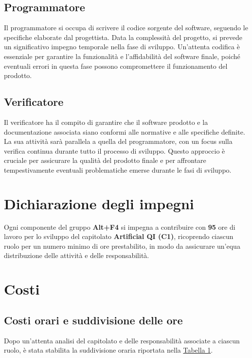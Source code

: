 \documentclass[a4paper, 12pt]{article}
\begin{document}
\subsection{Programmatore}
Il programmatore si occupa di scrivere il codice sorgente del software, seguendo le specifiche elaborate dal progettista. Data la complessità del progetto, si prevede un significativo impegno temporale nella fase di sviluppo. 
Un'attenta codifica è essenziale per garantire la funzionalità e l'affidabilità del software finale, poiché eventuali errori in questa fase possono compromettere il funzionamento del prodotto.
\subsection{Verificatore}
Il verificatore ha il compito di garantire che il software prodotto e la documentazione associata siano conformi alle normative e alle specifiche definite. 
La sua attività sarà parallela a quella del programmatore, con un focus sulla verifica continua durante tutto il processo di sviluppo. 
Questo approccio è cruciale per assicurare la qualità del prodotto finale e per affrontare tempestivamente eventuali problematiche emerse durante le fasi di sviluppo.

\newpage
\section {Dichiarazione degli impegni}
\label{sec:dic}
Ogni componente del gruppo \textbf{Alt+F4} si impegna a contribuire con \textbf{95} ore di lavoro per lo sviluppo del capitolato
\textbf{ Artificial QI (C1)}, ricoprendo ciascun ruolo per un numero minimo di ore prestabilito, in modo da assicurare un’equa distribuzione delle attività e delle responsabilità.
\section{Costi}
\label{sec:cost}
\subsection{Costi orari e suddivisione delle ore}
Dopo un’attenta analisi del capitolato e delle responsabilità associate a ciascun ruolo, è stata stabilita la suddivisione oraria riportata nella \hyperref[tab:ore]{Tabella 1}.
\end{document}

